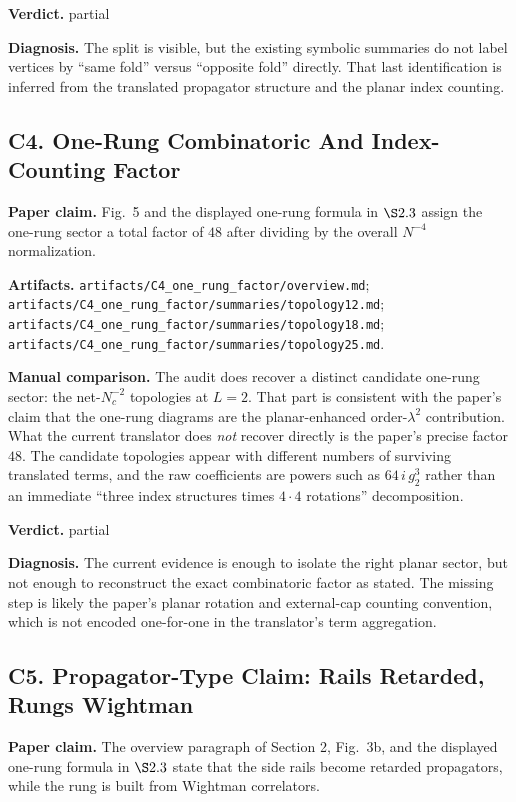 \documentclass[11pt]{article}
\begin{document}
\textbf{Verdict.} partial

\textbf{Diagnosis.} The split is visible, but the existing symbolic summaries do not label vertices by ``same fold'' versus ``opposite fold'' directly. That last identification is inferred from the translated propagator structure and the planar index counting.

\subsection*{C4. One-Rung Combinatoric And Index-Counting Factor}
\textbf{Paper claim.} Fig.~5 and the displayed one-rung formula in $\S 2.3$ assign the one-rung sector a total factor of $48$ after dividing by the overall $N^{-4}$ normalization.

\textbf{Artifacts.} \texttt{artifacts/C4\_one\_rung\_factor/overview.md}; \texttt{artifacts/C4\_one\_rung\_factor/summaries/topology12.md}; \texttt{artifacts/C4\_one\_rung\_factor/summaries/topology18.md}; \texttt{artifacts/C4\_one\_rung\_factor/summaries/topology25.md}.

\textbf{Manual comparison.} The audit does recover a distinct candidate one-rung sector: the net-$N_c^{-2}$ topologies at $L=2$. That part is consistent with the paper's claim that the one-rung diagrams are the planar-enhanced order-$\lambda^2$ contribution. What the current translator does \emph{not} recover directly is the paper's precise factor $48$. The candidate topologies appear with different numbers of surviving translated terms, and the raw coefficients are powers such as $64\,i\,g_2^3$ rather than an immediate ``three index structures times $4\cdot4$ rotations'' decomposition.

\textbf{Verdict.} partial

\textbf{Diagnosis.} The current evidence is enough to isolate the right planar sector, but not enough to reconstruct the exact combinatoric factor as stated. The missing step is likely the paper's planar rotation and external-cap counting convention, which is not encoded one-for-one in the translator's term aggregation.

\subsection*{C5. Propagator-Type Claim: Rails Retarded, Rungs Wightman}
\textbf{Paper claim.} The overview paragraph of Section 2, Fig.~3b, and the displayed one-rung formula in $\S 2.3$ state that the side rails become retarded propagators, while the rung is built from Wightman correlators.
\end{document}

